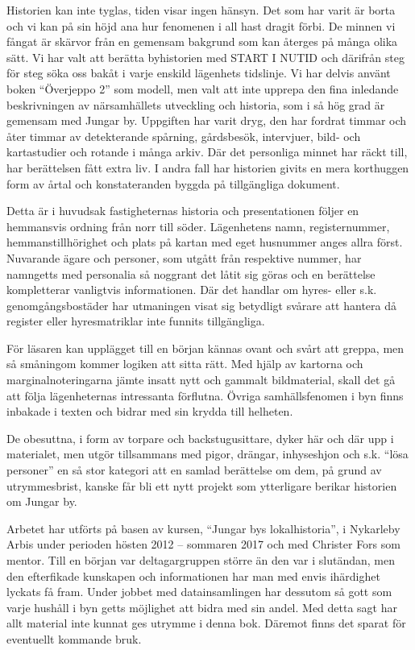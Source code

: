 

Historien kan inte tyglas, tiden visar ingen hänsyn. Det som har varit är borta och vi kan på sin höjd ana hur fenomenen i all hast dragit förbi. De minnen vi fångat är skärvor från en gemensam bakgrund som kan återges på många olika sätt. Vi har valt att berätta byhistorien med START I NUTID och därifrån steg för steg söka oss bakåt i varje enskild lägenhets tidslinje. Vi har delvis använt boken ``Överjeppo 2'' som modell, men valt att inte upprepa den fina inledande beskrivningen av närsamhällets utveckling och historia, som i så hög grad är gemensam med Jungar by. Uppgiften har varit dryg, den har fordrat timmar och åter timmar av detekterande spårning, gårdsbesök, intervjuer, bild- och kartastudier och rotande i många arkiv. Där det personliga minnet har räckt till, har berättelsen fått extra liv. I andra fall har historien givits en mera korthuggen form av årtal och konstateranden byggda på tillgängliga dokument.

Detta är i huvudsak fastigheternas historia och presentationen följer en hemmansvis ordning från norr till söder. Lägenhetens namn, registernummer, hemmanstillhörighet och plats på kartan med eget husnummer anges allra först. Nuvarande ägare och personer, som utgått från respektive nummer, har namngetts med personalia så noggrant det låtit sig göras och en berättelse kompletterar vanligtvis informationen. Där det handlar om hyres- eller s.k. genomgångsbostäder har utmaningen visat sig betydligt svårare att hantera då register eller hyresmatriklar inte funnits tillgängliga.

För läsaren kan upplägget till en början kännas ovant och svårt att greppa, men så småningom kommer logiken att sitta rätt. Med hjälp av kartorna och marginalnoteringarna jämte insatt nytt och gammalt bildmaterial, skall det gå att följa lägenheternas intressanta förflutna. Övriga samhällsfenomen i byn finns inbakade i texten och bidrar med sin krydda till helheten.

De obesuttna, i form av torpare och backstugusittare, dyker här och där upp i materialet, men utgör tillsammans med pigor, drängar, inhyseshjon och s.k. ``lösa personer'' en så stor kategori att en samlad berättelse om dem, på grund av utrymmesbrist, kanske får bli ett nytt projekt som ytterligare berikar historien om Jungar by.

Arbetet har utförts på basen av kursen, ``Jungar bys lokalhistoria'', i Nykarleby Arbis under perioden hösten 2012 -- sommaren 2017 och med Christer Fors som mentor. Till en början var deltagargruppen större än den var i slutändan, men den efterfikade kunskapen och informationen har man med envis ihärdighet lyckats få fram. Under jobbet med datainsamlingen har dessutom så gott som varje hushåll i byn getts möjlighet att bidra med sin andel. Med detta sagt har allt material inte kunnat ges utrymme i denna bok. Däremot finns det sparat för eventuellt kommande bruk.


